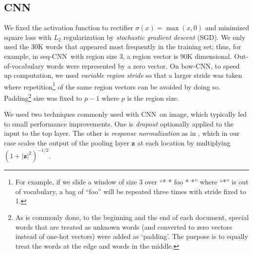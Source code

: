 \documentclass[11pt,letterpaper]{article}
\newcommand{\cnn}{CNN}
\newcommand{\scnn}{seq-CNN}
\newcommand{\bcnn}{bow-CNN}
\newcommand{\bz}{{\mathbf z}}
\newcommand{\activ}{\sigma}
\begin{document}
\subsection{\cnn}

We fixed the activation function to 
rectifier {\small $\activ(x)=\max(x,0)$} and minimized square loss with $L_2$ 
regularization by 
{\em stochastic gradient descent} (SGD).  
We only used the 30K words that appeared most frequently in the training set; 
thus, for example, 
in \scnn\ with region size 3, a region vector is 90K dimensional.  
Out-of-vocabulary words were represented by a zero vector.  
On \bcnn, to speed up computation, 
we used {\em variable region stride} 
so that a larger stride was taken where repetition\footnote{
  For example, if we slide a window of size 3 over ``* * foo * *''
  where ``*'' is out of vocabulary, 
  a bag of ``foo'' will be repeated three times with stride fixed to 1.   
} 
of the same region vectors
can be avoided by doing so.  
Padding\footnote{
  As is commonly done, 
  to the beginning and the end of each document, special words that are treated as unknown words 
  (and converted to zero vectors instead of one-hot vectors) were added as `padding'.
  The purpose is to equally treat the words at the edge and words in the middle.  
}
size was fixed to $p-1$ where $p$ is the region size.  

We used two techniques commonly used with \cnn\ on image, which typically 
led to small performance improvements.  
One is {\em dropout} \cite{dropout12} optionally applied to the input to the top layer.  
The other is {\em response normalization} as in \cite{imagenetNips12}, 
which in our case scales the output of the pooling layer 
$\bz$ at each location by multiplying $(1 + |\bz|^2)^{-1/2}$.  
\end{document}
